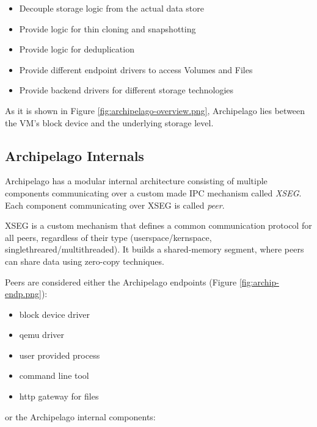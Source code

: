 \begin{itemize}        
\item Decouple storage logic from the actual data store 
\item Provide logic for thin cloning and snapshotting 
\item Provide logic for deduplication 
\item Provide different endpoint drivers to access Volumes and Files 
\item Provide backend drivers for different storage technologies
\end{itemize}

As it is shown in Figure \ref{fig:archipelago-overview.png}, Archipelago lies
between the VM's block device and the underlying storage level.
  

\subsection{Archipelago Internals}

Archipelago has a modular internal architecture consisting of multiple
components communicating over a custom made IPC mechanism called \textit{XSEG}.
Each component communicating over XSEG is called \textit{peer}. 

XSEG is a custom mechanism that defines a common communication protocol for all
peers, regardless of their type (userspace/kernspace,
singlethreared/multithreaded). It builds a shared-memory segment, where peers
can share data using zero-copy techniques. 


Peers are considered either the Archipelago endpoints (Figure
\ref{fig:archip-endp.png}):
\begin{itemize}
\item block device driver
\item qemu driver
\item user provided process
\item command line tool
\item http gateway for files
\end{itemize}

or the Archipelago internal components:

